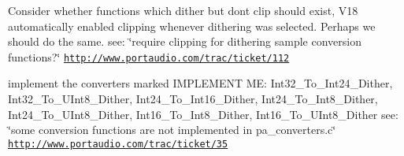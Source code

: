 \begin{DoxyRefList}
$$\item[\label{todo__todo000007}%
\hypertarget{todo__todo000007}{}%
File \hyperlink{pa__converters_8c}{pa\+\_\+converters.c} ]Consider whether functions which dither but don\textquotesingle{}t clip should exist, V18 automatically enabled clipping whenever dithering was selected. Perhaps we should do the same. see\+: \char`\"{}require clipping for dithering sample conversion functions?\char`\"{} \href{http://www.portaudio.com/trac/ticket/112}{\tt http\+://www.\+portaudio.\+com/trac/ticket/112}

implement the converters marked I\+M\+P\+L\+E\+M\+E\+NT ME\+: Int32\+\_\+\+To\+\_\+\+Int24\+\_\+\+Dither, Int32\+\_\+\+To\+\_\+\+U\+Int8\+\_\+\+Dither, Int24\+\_\+\+To\+\_\+\+Int16\+\_\+\+Dither, Int24\+\_\+\+To\+\_\+\+Int8\+\_\+\+Dither, Int24\+\_\+\+To\+\_\+\+U\+Int8\+\_\+\+Dither, Int16\+\_\+\+To\+\_\+\+Int8\+\_\+\+Dither, Int16\+\_\+\+To\+\_\+\+U\+Int8\+\_\+\+Dither see\+: \char`\"{}some conversion functions are not implemented in pa\+\_\+converters.\+c\char`\"{} \href{http://www.portaudio.com/trac/ticket/35}{\tt http\+://www.\+portaudio.\+com/trac/ticket/35}


\end{DoxyRefList}
